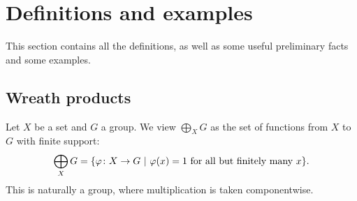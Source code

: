 \documentclass[a4paper]{article}
\newtheorem{cor}[lem]{Corollary}
\theoremstyle{definition}
\newcommand{\setst}[2]{\{#1\ |\ #2\}}
\begin{document}
%
%
%
%
%
%
%
%
%
%
\section{Definitions and examples}\label{Section:Def}
This section contains all the definitions, as well as some useful preliminary facts and some examples.
%
%
%
%
%
%
%
%
%
%
\subsection{Wreath products}
%
%
%
%
%
Let $X$ be a set and $G$ a group. We view
$\bigoplus_XG$ as the set of functions from $X$ to $G$ with finite support:
\[
	\bigoplus_XG=\setst{\varphi\colon X\to G}{\varphi(x)=1 \textnormal{ for all but finitely many }x}.
\]
This is naturally a group, where multiplication is taken componentwise.
\end{document}
